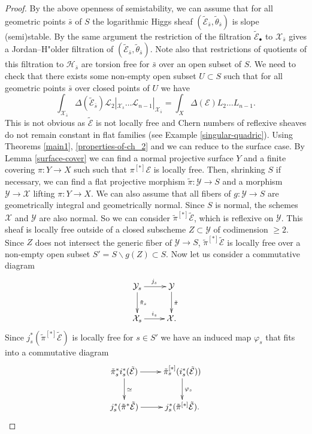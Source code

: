 \documentclass[12pt]{article}
\theoremstyle{plain}
\theoremstyle{definition}
\theoremstyle{remark}
\newcommand{\cE}{{\mathcal E}}
\newcommand{\cH}{{\mathcal H}}
\newcommand{\cL}{{\mathcal L}}
\newcommand{\cX}{{\mathcal X}}
\newcommand{\cY}{{\mathcal Y}}
\begin{document}
\begin{proof}
By the above openness of semistability, we can assume that for all geometric points $\bar s$ of $S$ the logarithmic Higgs sheaf $(\tilde \cE _{\bar s}, \tilde \theta _{\bar s})$ is slope (semi)stable. By the same argument the restriction of the  filtration $\tilde \cE_{\bullet}$ to $\cX_{\bar s}$ gives a Jordan--H"older filtration of  $(\tilde \cE _{\bar s}, \tilde \theta _{\bar s})$. Note also that restrictions of quotients of this filtration to $\cH_{\bar s}$ are torsion free for $\bar s$ over an open subset of $S$.
We need to check that there exists some non-empty open subset $U\subset S$ such that for all geometric points $\bar s$ over  closed points of $U$ we have
$$\int_{\cX_{\bar s}}\Delta (\tilde \cE _{{\bar s}})\cL_2|_{\cX_{\bar s}}\dots \cL_{n-1}|_{\cX_{\bar s}}= \int_X\Delta (\cE)L_2\dots L_{n-1}.$$
This is not obvious as $\tilde \cE$ is not locally free and Chern numbers of reflexive sheaves do not remain constant in flat families (see Example \ref{singular-quadric}).
Using Theorems \ref{main1}, \ref{properties-of-ch_2} and \cite[Theorem 5.8]{La-Chern} we can reduce to the surface case. By Lemma \ref{surface-cover} we can find a normal projective surface $Y$ and a finite covering $\pi: Y\to X$ such such that $\pi^{[*]}\cE$  is locally free. Then, shrinking $S$ if necessary, we can find a flat projective morphism $\tilde \pi: \cY \to S$ and a morphism $\cY \to \cX$ lifting $\pi: Y\to X$. We can also assume that all fibers of $g: \cY\to S$ are geometrically integral and geometrically normal. Since $S$ is normal, the schemes $\cX$ and $\cY$ are also normal.
So we can consider  $\tilde \pi^{[*]}\tilde \cE$, which is reflexive on $\cY$.
This sheaf is locally free outside of a closed subscheme $Z\subset \cY$ of codimension $\ge 2$. Since $Z$ does not intersect the generic fiber of $\cY\to S$,  $\tilde \pi^{[*]}\tilde \cE$ is locally free over a non-empty open subset $S'=S\backslash g(Z)\subset S$. Now let us consider a commutative diagram
$$
\xymatrix{
	\cY_s \ar[r]^{j_s}\ar[d]^{\tilde \pi _s}&\cY\ar[d]^{\tilde \pi}\\
\cX_s \ar[r]^{i_s}& \cX. \\
}$$
 Since $j_s^*(\tilde \pi^{[*]}\tilde \cE)$ is locally free for $s\in S'$ we have an induced map $\varphi _s$ that fits into a commutative diagram
 $$
 \xymatrix{
 \tilde \pi_s^{*} i_s^*(\tilde \cE)\ar[r]\ar[d]^{\simeq}& \tilde \pi_s^{[*]} (i_s^*(\tilde \cE))\ar[d]^{\varphi _s}\\
 j_s^*(\tilde \pi^{*}\tilde \cE)\ar[r]&	j_s^*(\tilde \pi^{[*]}\tilde \cE).\\
}$$
\end{proof}
\end{document}
